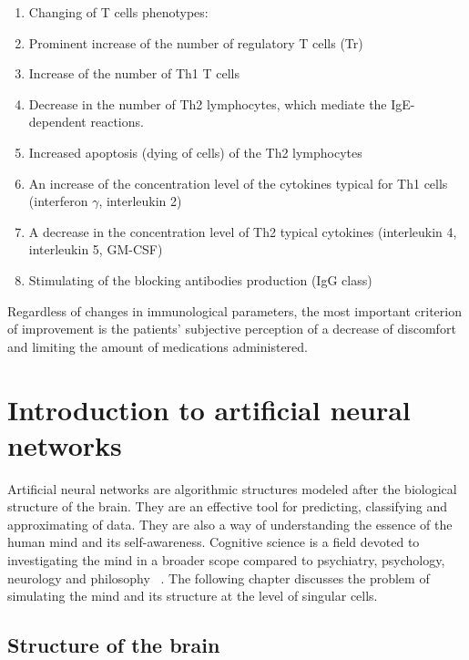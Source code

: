 \documentclass[10pt,oneside]{memoir}
\begin{document}
\begin{enumerate}


\item Changing of T cells phenotypes:

\item Prominent increase of the number of regulatory T cells (Tr)

\item Increase of the number of Th1 T cells

\item Decrease in the number of Th2 lymphocytes, which mediate the IgE-dependent reactions.

\item Increased apoptosis (dying of cells) of the Th2 lymphocytes

\item An increase  of the concentration level of the cytokines typical for Th1 cells (interferon $\gamma $, interleukin 2)

\item A decrease in the concentration level of Th2 typical cytokines (interleukin 4, interleukin 5, GM-CSF)

\item Stimulating of the blocking antibodies production (IgG class)
\end{enumerate}

Regardless of changes in immunological parameters, the most important criterion of improvement is the patients' subjective perception of a decrease of discomfort and limiting the amount of medications administered.


\part{Introduction to artificial neural networks}
\label{chapter3}

Artificial neural networks are algorithmic structures modeled after the biological structure of the brain. They are an effective tool for predicting, classifying and approximating of data. They are also a way of understanding the essence of the human mind and its self-awareness. Cognitive science is a field devoted to investigating the mind in a broader scope compared to psychiatry, psychology, neurology and philosophy ~\cite{Duch:2004:NaukiKognitywne}.
The following chapter discusses the problem of simulating the mind and its structure at the level of singular cells.


\chapter{Structure of the brain}
\label{structureofthebrain}
\end{document}
